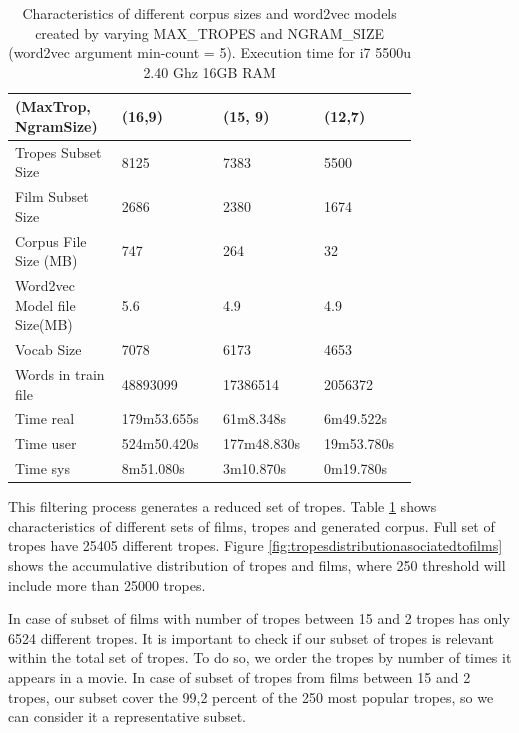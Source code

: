 \documentclass[letterpaper]{article}
\begin{document}
\begin{table}[t]
	\centering
	\begin{tabular}{|p{0.20\linewidth}|p{0.2\linewidth}|p{0.2\linewidth}|p{0.2\linewidth}|}
		\hline
		\textbf{(MaxTrop, NgramSize)}& \textbf{(16,9)} & \textbf{(15, 9)} & \textbf{(12,7)}\\
		\hline
		\hline
		Tropes Subset Size&8125&7383& 5500\\
		\hline
		Film Subset Size&2686&2380& 1674\\
		\hline
		Corpus File Size (MB)&747&264& 32\\
		\hline
	    Word2vec Model file Size(MB)&5.6&4.9&4.9\\
		\hline
		Vocab Size& 7078 & 6173 & 4653\\
		\hline
		Words in train file& 48893099 & 17386514 &2056372\\
		\hline
		Time real&179m53.655s&61m8.348s&6m49.522s\\
        \hline
		Time user&524m50.420s&177m48.830s&19m53.780s\\
		\hline
	    Time sys&8m51.080s&3m10.870s&0m19.780s\\
		\hline
		
	\end{tabular}
	\caption{Characteristics of different corpus sizes and word2vec models created by varying MAX\_TROPES and NGRAM\_SIZE (word2vec argument min-count = 5). Execution time for i7 5500u 2.40 Ghz 16GB RAM}
	\label{tab:corpusSize}
\end{table}
	
	
	
	This filtering process generates a reduced set of tropes. Table \ref{tab:corpusSize} shows characteristics of different sets of films, tropes and generated corpus. Full set of tropes have 25405 different tropes. Figure \ref{fig:tropesdistributionasociatedtofilms} shows the accumulative distribution of tropes and films, where 250 threshold will include more than 25000 tropes. 
	
	
	In case of subset of films with number of tropes between 15 and 2 tropes has only 6524 different tropes. 
    It is important to check if our subset of tropes is relevant within the total set of tropes. To do so, we order the tropes by number of times it appears in a movie. In case of subset of tropes from films between 15 and 2 tropes, our subset cover the 99,2 percent of the 250 most popular tropes, so we can consider it a representative subset. 
	
\end{document}
